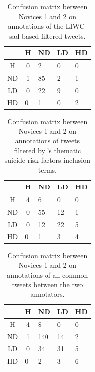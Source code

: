 \documentclass[11pt]{article}
\begin{document}
\begin{table}[h]
\centering
\begin{tabular}{c|c|l||l|l|}
\cline{2-5}
                         & H                       & ND & LD & HD \\ \hline
\multicolumn{1}{|c|}{H}  & 0                       & 2  & 0  & 0  \\ \hline
\multicolumn{1}{|c|}{ND} & 1                       & 85 & 2  & 1  \\ \hline \hline
\multicolumn{1}{|c|}{LD} & 0                       & 22 & 9  & 0  \\ \hline
\multicolumn{1}{|l}{HD}  & \multicolumn{1}{|l|}{0} & 1  & 0  & 2  \\ \hline
\end{tabular}
\caption {Confusion matrix between Novices 1 and 2 on annotations of the LIWC-sad-based filtered tweets.}
\label{tab:liwc-conf}
\end{table}

\begin{table}[h]
\centering
\begin{tabular}{c|c|l||l|l|}
\cline{2-5}
                         & H                       & ND & LD & HD \\ \hline
\multicolumn{1}{|c|}{H}  & 4                       & 6  & 0  & 0  \\ \hline
\multicolumn{1}{|c|}{ND} & 0                       & 55 & 12 & 1  \\ \hline \hline
\multicolumn{1}{|c|}{LD} & 0                       & 12 & 22 & 5  \\ \hline
\multicolumn{1}{|l}{HD}  & \multicolumn{1}{|l|}{0} & 1  & 3  & 4  \\ \hline
\end{tabular}
\caption {Confusion matrix between Novices 1 and 2 on annotations of tweets filtered by 's thematic suicide risk factors inclusion terms.}
\label{tab:j-conf}
\end{table}

\begin{table}[h]
\centering
\begin{tabular}{c|c|l||l|l|}
\cline{2-5}
                         & H                       & ND  & LD & HD \\ \hline
\multicolumn{1}{|c|}{H}  & 4                       & 8   & 0  & 0  \\ \hline
\multicolumn{1}{|c|}{ND} & 1                      & 140 & 14 & 2  \\ \hline \hline
\multicolumn{1}{|c|}{LD} & 0                       & 34  & 31 & 5  \\ \hline
\multicolumn{1}{|l}{HD}  & \multicolumn{1}{|l|}{0} & 2   & 3  & 6  \\ \hline
\end{tabular}
\caption {Confusion matrix between Novices 1 and 2 on annotations of all common tweets between the two annotators.}
\label{tab:both-conf}
\end{table}
\end{document}
